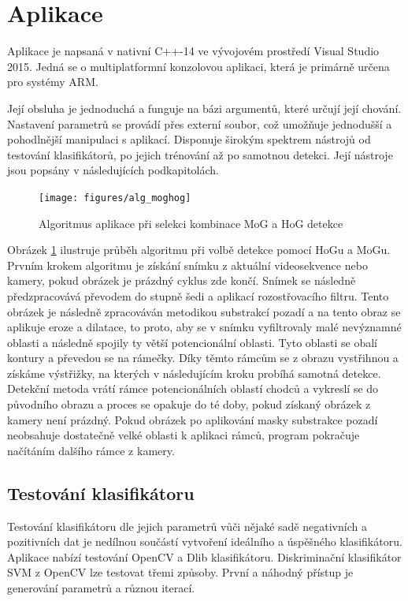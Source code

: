 \section{Aplikace}
Aplikace je napsaná v nativní C++-14 ve vývojovém prostředí Visual Studio 2015. Jedná se o multiplatformní konzolovou aplikaci, která je primárně určena pro systémy ARM. 

Její obsluha je jednoduchá a funguje na bázi argumentů, které určují její chování. Nastavení parametrů se provádí přes externí soubor, což umožňuje jednodušší a pohodlnější manipulaci s aplikací. Disponuje širokým spektrem nástrojů od testování klasifikátorů, po jejich trénování až po samotnou detekci. Její nástroje jsou popsány v následujících podkapitolách.

 \begin{figure}[H]
\centering
\texttt{[image: figures/alg\_moghog]}
\caption{Algoritmus aplikace při selekci kombinace MoG a HoG detekce}
\label{mog_algorithm}
\end{figure}

Obrázek \ref{mog_algorithm} ilustruje průběh algoritmu při volbě detekce pomocí HoGu a MoGu. Prvním krokem algoritmu je získání snímku z aktuální videosekvence nebo kamery, pokud obrázek je prázdný cyklus zde končí. Snímek se následně předzpracovává převodem do stupně šedi a aplikací rozostřovacího filtru. Tento obrázek je následně zpracováván metodikou substrakcí pozadí a na tento obraz se aplikuje eroze a dilatace, to proto, aby se v snímku vyfiltrovaly malé nevýznamné oblasti a následně spojily ty větší potencionální oblasti. Tyto oblasti se obalí kontury a převedou se na rámečky. Díky těmto rámcům se z obrazu vystřihnou a získáme výstřižky, na kterých v následujícím kroku probíhá samotná detekce. Detekční metoda vrátí rámce potencionálních oblastí chodců a vykreslí se do původního obrazu a proces se opakuje do té doby, pokud získaný obrázek z kamery není prázdný. Pokud obrázek po aplikování masky substrakce pozadí neobsahuje dostatečně velké oblasti k aplikaci rámců, program pokračuje načítáním dalšího rámce z kamery.  

\subsection{Testování klasifikátoru}
Testování klasifikátoru dle jejich parametrů vůči nějaké sadě negativních a pozitivních dat je nedílnou součástí vytvoření ideálního a úspěšného klasifikátoru.  Aplikace nabízí testování OpenCV a Dlib klasifikátoru. Diskriminační klasifikátor SVM z OpenCV lze testovat třemi způsoby. První a náhodný přístup je generování parametrů a různou iterací.

